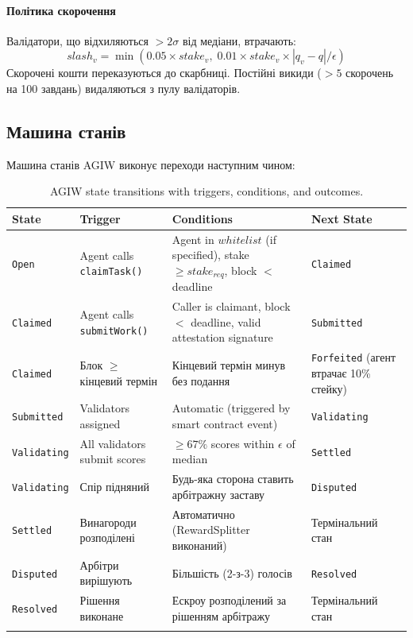 \documentclass[11pt]{article}
\begin{document}
\paragraph{Політика скорочення} Валідатори, що відхиляються $>2\sigma$ від медіани, втрачають:
\begin{equation}
slash_v = \min(0.05 \times stake_v, \; 0.01 \times stake_v \times |q_v - q| / \epsilon)
\end{equation}
Скорочені кошти переказуються до скарбниці. Постійні викиди ($>5$ скорочень на 100 завдань) видаляються з пулу валідаторів.

\subsection{Машина станів}
\label{sec:agiw-state-machine}
Машина станів AGIW виконує переходи наступним чином:
\begin{longtable}{@{}p{}p{}p{}p{}@{}}
\toprule
\textbf{State} & \textbf{Trigger} & \textbf{Conditions} & \textbf{Next State} \\\midrule
\texttt{Open} & Agent calls \texttt{claimTask()} & Agent in $whitelist$ (if specified), stake $\geq stake_{req}$, block $<$ deadline & \texttt{Claimed} \\
\texttt{Claimed} & Agent calls \texttt{submitWork()} & Caller is claimant, block $<$ deadline, valid attestation signature & \texttt{Submitted} \\
\texttt{Claimed} & Блок $\geq$ кінцевий термін & Кінцевий термін минув без подання & \texttt{Forfeited} (агент втрачає 10\% стейку) \\
\texttt{Submitted} & Validators assigned & Automatic (triggered by smart contract event) & \texttt{Validating} \\
\texttt{Validating} & All validators submit scores & $\geq 67\%$ scores within $\epsilon$ of median & \texttt{Settled} \\
\texttt{Validating} & Спір підняний & Будь-яка сторона ставить арбітражну заставу & \texttt{Disputed} \\
\texttt{Settled} & Винагороди розподілені & Автоматично (RewardSplitter виконаний) & Термінальний стан \\
\texttt{Disputed} & Арбітри вирішують & Більшість (2-з-3) голосів & \texttt{Resolved} \\
\texttt{Resolved} & Рішення виконане & Ескроу розподілений за рішенням арбітражу & Термінальний стан \\\bottomrule
\caption{AGIW state transitions with triggers, conditions, and outcomes.}
\label{tab:agiw-states}
\end{longtable}
\end{document}
